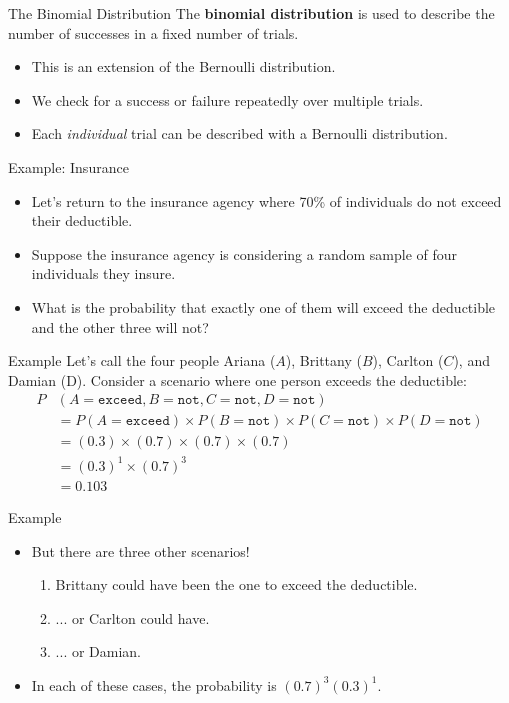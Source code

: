 \begin{frame}{The Binomial Distribution}
    The \textbf{binomial distribution} is used to describe the number of successes in a fixed number of trials.
    \begin{itemize}
        \item This is an extension of the Bernoulli distribution.
        \item We check for a success or failure repeatedly over multiple trials.
        \item Each \textit{individual} trial can be described with a Bernoulli distribution.
    \end{itemize}
\end{frame}

\begin{frame}{Example: Insurance}
    \begin{itemize}
        \item Let’s return to the insurance agency where 70\% of individuals do not exceed their deductible.
        \item Suppose the insurance agency is considering a random sample of four individuals they insure. 
        \item What is the probability that exactly one of them will exceed the deductible and the other three will not? 
    \end{itemize}
\end{frame}

\begin{frame}{Example}
    Let’s call the four people Ariana ($A$), Brittany ($B$), Carlton ($C$), and Damian (D). Consider a scenario where one person exceeds the deductible:
\begin{align*}
    P&(A=\texttt{exceed}, B=\texttt{not}, C=\texttt{not}, D=\texttt{not}) \\
    &= P (A = \texttt{exceed})\times P (B = \texttt{not})\times P (C = \texttt{not})\times P (D = \texttt{not}) \\ 
    &= (0.3)\times(0.7)\times(0.7)\times(0.7) \\
    &= (0.3)^1\times(0.7)^3 \\
    &= 0.103
\end{align*}
\end{frame}

\begin{frame}{Example}
    \begin{itemize}
        \item But there are three other scenarios! 
            \begin{enumerate}
                \item Brittany could have been the one to exceed the deductible.
                \item ... or Carlton could have.
                \item ... or Damian.
            \end{enumerate}
        \item In each of these cases, the probability is $(0.7)^3(0.3)^1$. 
    \end{itemize}
\end{frame}

